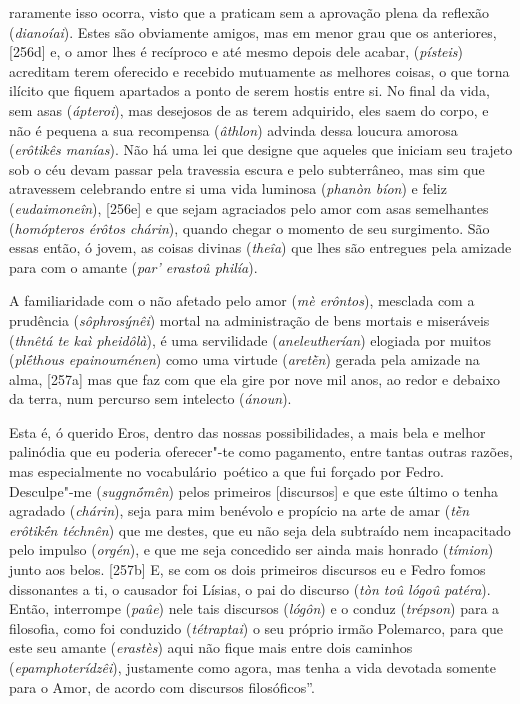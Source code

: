 raramente isso ocorra, visto que a praticam sem a aprovação plena da
reflexão (\emph{dianoíai}). Estes são obviamente amigos, mas em menor
grau que os anteriores, [256d] e, o amor lhes é recíproco e até
mesmo depois dele acabar, (\emph{písteis}) acreditam terem oferecido e
recebido mutuamente as melhores coisas, o que torna ilícito que fiquem
apartados a ponto de serem hostis entre si. No final da vida, sem asas
(\emph{ápteroi}), mas desejosos de as terem adquirido, eles saem do
corpo, e não é pequena a sua recompensa (\emph{âthlon}) advinda dessa
loucura amorosa (\emph{erôtikês manías}). Não há uma lei que designe que
aqueles que iniciam seu trajeto sob o céu devam passar pela travessia
escura e pelo subterrâneo, mas sim que atravessem celebrando entre si
uma vida luminosa (\emph{phanòn bíon}) e feliz (\emph{eudaimoneîn}),
[256e] e que sejam agraciados pelo amor com asas semelhantes
(\emph{homópteros érôtos chárin}), quando chegar o momento de seu
surgimento. São essas então, ó jovem, as coisas divinas (\emph{theîa})
que lhes são entregues pela amizade para com o amante (\emph{par'
erastoû philía}).

A familiaridade com o não afetado pelo amor (\emph{mè erôntos}),
mesclada com a prudência (\emph{sôphrosýnêi}) mortal na administração de
bens mortais e miseráveis (\emph{thnêtá te kaì pheidôlà}), é uma
servilidade (\emph{aneleutherían}) elogiada por muitos (\emph{plḗthous
epainouménen}) como uma virtude (\emph{aretḕn}) gerada pela amizade na
alma, [257a] mas que faz com que ela gire por nove mil anos, ao
redor e debaixo da terra, num percurso sem intelecto (\emph{ánoun}).

Esta é, ó querido Eros, dentro das nossas possibilidades, a mais bela e
melhor palinódia que eu poderia oferecer"-te como pagamento, entre tantas
outras razões, mas especialmente no vocabulário~poético a que fui
forçado por Fedro. Desculpe"-me (\emph{suggnṓmên}) pelos primeiros
[discursos] e que este último o tenha agradado (\emph{chárin}), seja
para mim benévolo e propício na arte de amar (\emph{tḕn erôtikḗn
téchnên}) que me destes, que eu não seja dela subtraído nem incapacitado
pelo impulso (\emph{orgén}), e que me seja concedido ser ainda mais
honrado (\emph{tímion}) junto aos belos. [257b] E, se com os dois
primeiros discursos eu e Fedro fomos dissonantes a ti, o causador foi
Lísias, o pai do discurso (\emph{tòn toû lógoû patéra}). Então,
interrompe (\emph{paûe}) nele tais discursos (\emph{lógôn}) e o conduz
(\emph{trépson}) para a filosofia, como foi conduzido (\emph{tétraptai})
o seu próprio irmão Polemarco, para que este seu amante (\emph{erastès})
aqui não fique mais entre dois caminhos (\emph{epamphoterídzêi}),
justamente como agora, mas tenha a vida devotada somente para o Amor, de
acordo com discursos filosóficos''.

